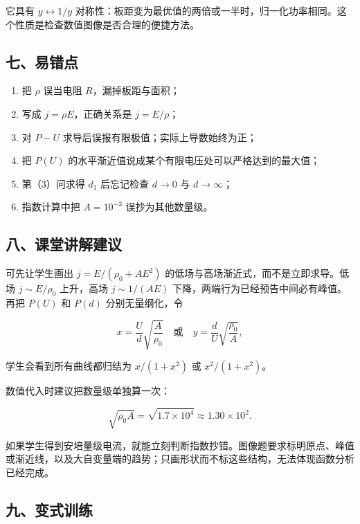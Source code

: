 \documentclass[12pt,a4paper,UTF8]{ctexart}
\newcommand{\tightlist}{\setlength{\itemsep}{0pt}\setlength{\parskip}{0pt}}
\begin{document}
它具有 \(y\leftrightarrow1/y\)
对称性：板距变为最优值的两倍或一半时，归一化功率相同。这个性质是检查数值图像是否合理的便捷方法。

\subsection{七、易错点}\label{ux4e03ux6613ux9519ux70b9-1}

\begin{enumerate}
\def\labelenumi{\arabic{enumi}.}
\tightlist
\item
  把 \(\rho\) 误当电阻 \(R\)，漏掉板距与面积；
\item
  写成 \(j=\rho E\)，正确关系是 \(j=E/\rho\)；
\item
  对 \(P-U\) 求导后误报有限极值；实际上导数始终为正；
\item
  把 \(P(U)\) 的水平渐近值说成某个有限电压处可以严格达到的最大值；
\item
  第（3）问求得 \(d_1\) 后忘记检查 \(d\to0\) 与 \(d\to\infty\)；
\item
  指数计算中把 \(A=10^{-3}\) 误抄为其他数量级。
\end{enumerate}

\subsection{八、课堂讲解建议}\label{ux516bux8bfeux5802ux8bb2ux89e3ux5efaux8bae-1}

可先让学生画出 \(j=E/(\rho_0+AE^2)\)
的低场与高场渐近式，而不是立即求导。低场 \(j\sim E/\rho_0\) 上升，高场
\(j\sim1/(AE)\) 下降，两端行为已经预告中间必有峰值。再把 \(P(U)\) 和
\(P(d)\) 分别无量纲化，令

\[
x=\frac{U}{d}\sqrt{\frac A{\rho_0}}
\quad\text{或}\quad
y=\frac d{U}\sqrt{\frac{\rho_0}{A}},
\]

学生会看到所有曲线都归结为 \(x/(1+x^2)\) 或 \(x^2/(1+x^2)\)。

数值代入时建议把数量级单独算一次：

\[
\sqrt{\rho_0A}
=\sqrt{1.7\times10^4}
\approx1.30\times10^2.
\]

如果学生得到安培量级电流，就能立刻判断指数抄错。图像题要求标明原点、峰值或渐近线，以及大自变量端的趋势；只画形状而不标这些结构，无法体现函数分析已经完成。

\subsection{九、变式训练}\label{ux4e5dux53d8ux5f0fux8badux7ec3-1}
\end{document}
